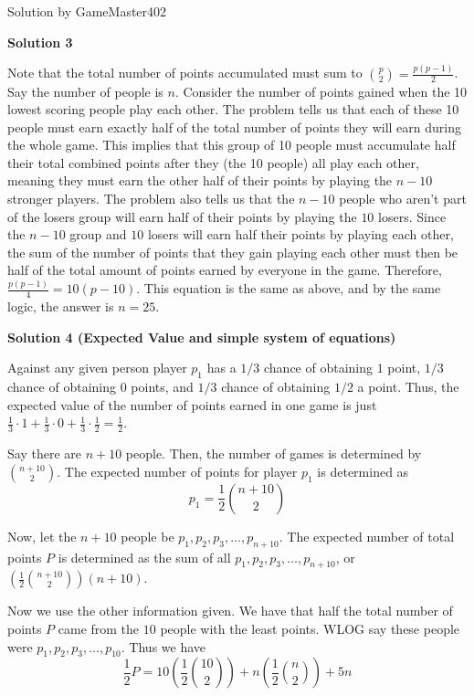 \begin{enumerate}
 Solution by GameMaster402

 



\textbf{Solution 3}

Note that the total number of points accumulated must sum to ${p \choose 2} = \frac{p(p-1)}{2}$. Say the number of people is $n$. Consider the number of points gained when the 10 lowest scoring people play each other. The problem tells us that each of these 10 people must earn exactly half of the total number of points they will earn during the whole game. This implies that this group of 10 people must accumulate half their total combined points after they (the 10 people) all play each other, meaning they must earn the other half of their points by playing the $n-10$ stronger players. The problem also tells us that the $n-10$ people who aren't part of the losers group will earn half of their points by playing the $10$ losers.  Since the $n-10$ group and $10$ losers will earn half their points by playing each other, the sum of the number of points that they gain playing each other must then be half of the total amount of points earned by everyone in the game. Therefore, $\frac{p(p-1)}{4} = 10(p-10)$. This equation is the same as above, and by the same logic, the answer is $n=\boxed{25}$.

 



\textbf{Solution 4 (Expected Value and simple system of equations)}

Against any given person player \( p_1 \) has a \( 1/3 \) chance of obtaining \( 1 \) point, \( 1/3 \) chance of obtaining \( 0 \) points, and \( 1/3 \) chance of obtaining \( 1/2 \) a point. Thus, the expected value of the number of points earned in one game is just \( \frac{1}{3} \cdot 1 + \frac{1}{3} \cdot 0 + \frac{1}{3} \cdot \frac{1}{2} = \frac{1}{2} \). 

 Say there are \( n+10 \) people. Then, the number of games is determined by \( \binom{n+10}{2} \). The expected number of points for player \( p_1 \) is determined as 
 \[p_1 = \frac{1}{2} \binom{n+10}{2}\]

 Now, let the \( n+10 \) people be \( p_1, p_2, p_3, \dots, p_{n+10} \). The expected number of total points \( P \) is determined as the sum of all \( p_1, p_2, p_3, \dots, p_{n+10} \), or \( \left( \frac{1}{2} \binom{n+10}{2} \right)(n+10) \). 

 Now we use the other information given. We have that half the total number of points \( P \) came from the \( 10 \) people with the least points. WLOG say these people were \( p_1, p_2, p_3, \dots, p_{10} \). Thus we have
 \[\frac{1}{2} P = 10 \left( \frac{1}{2} \binom{10}{2} \right) + n \left( \frac{1}{2} \binom{n}{2} \right) + 5n\]


\end{enumerate}
